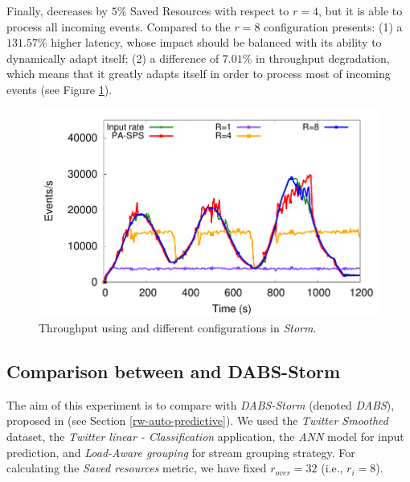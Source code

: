 Finally, \pSPS{}  decreases by $5\%$ Saved Resources with respect to $r=4$, but it is able to process all incoming events. Compared to the $r=8$ configuration \pSPS{} presents: (1) a $131.57\%$ higher latency, whose impact should be balanced with its ability to dynamically adapt itself; (2) a difference of $7.01\%$ in throughput degradation, which means that it greatly adapts itself in order to process most of incoming events (see Figure \ref{fig:exp-pa-storm-throughput}).

\begin{figure}[!ht]
     \centering
     \includegraphics[width=0.75\linewidth]{figures/exp/predictive/TwitterLinear-Storm-Throughput.pdf}
     \caption{Throughput using \textit{\pSPS{}} and different configurations in \textit {Storm}.}
     \label{fig:exp-pa-storm-throughput}
\end{figure}

\subsection{Comparison between \pSPS{} and DABS-Storm}
\label{exp:pa-dabs}
The aim of this experiment is to compare \pSPS{} with \textit{DABS-Storm} (denoted \textit{DABS}), proposed in \cite{KombiLLRB19} (see Section \ref{rw-auto-predictive}). We used the \textit{Twitter Smoothed} dataset, the \textit{Twitter linear - Classification} application, the \textit{ANN} model for input prediction, and \textit{Load-Aware grouping} for stream grouping strategy. For calculating the \textit{Saved resources} metric, we have fixed $r_{over} = 32$ (i.e., $r_i = 8$).


